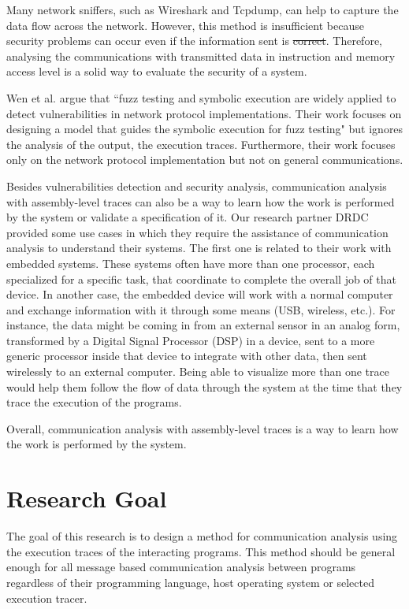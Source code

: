 \documentclass[12pt,oneside]{book}
\providecommand{\DIFaddtex}[1]{{\protect\color{blue}\uwave{#1}}} %
\providecommand{\DIFdeltex}[1]{{\protect\color{red}\sout{#1}}}                      %
\providecommand{\DIFaddbegin}{} %
\providecommand{\DIFaddend}{} %
\providecommand{\DIFdelbegin}{} %
\providecommand{\DIFdelend}{} %
\providecommand{\DIFadd}[1]{\texorpdfstring{\DIFaddtex{#1}}{#1}} %
\providecommand{\DIFdel}[1]{\texorpdfstring{\DIFdeltex{#1}}{}} %
\newcommand{\DIFscaledelfig}{0.5}
\newlength{\DIFdelgraphicswidth} %
\newlength{\DIFdelgraphicsheight} %
\newcommand{\DIFaddincludegraphics}[2][]{{\color{blue}\fbox{\DIFOincludegraphics[#1]{#2}}}} %
\newcommand{\DIFdelincludegraphics}[2][]{%
\sbox{\DIFdelgraphicsbox}{\DIFOincludegraphics[#1]{#2}}%
\settoboxwidth{\DIFdelgraphicswidth}{\DIFdelgraphicsbox} %
\settoboxtotalheight{\DIFdelgraphicsheight}{\DIFdelgraphicsbox} %
\scalebox{\DIFscaledelfig}{%
\parbox[b]{\DIFdelgraphicswidth}{\usebox{\DIFdelgraphicsbox}\\[-\baselineskip] \rule{\DIFdelgraphicswidth}{0em}}\llap{\resizebox{\DIFdelgraphicswidth}{\DIFdelgraphicsheight}{%
\setlength{\unitlength}{\DIFdelgraphicswidth}%
\begin{picture}(1,1)%
\thicklines\linethickness{2pt} %
{\color[rgb]{1,0,0}\put(0,0){\framebox(1,1){}}}%
{\color[rgb]{1,0,0}\put(0,0){\line( 1,1){1}}}%
{\color[rgb]{1,0,0}\put(0,1){\line(1,-1){1}}}%
\end{picture}%
}\hspace*{3pt}}} %
} %
\DeclareRobustCommand{\DIFaddbegin}{\DIFOaddbegin \let\includegraphics\DIFaddincludegraphics} %
\DeclareRobustCommand{\DIFaddend}{\DIFOaddend \let\includegraphics\DIFOincludegraphics} %
\DeclareRobustCommand{\DIFdelbegin}{\DIFOdelbegin \let\includegraphics\DIFdelincludegraphics} %
\DeclareRobustCommand{\DIFdelend}{\DIFOaddend \let\includegraphics\DIFOincludegraphics} %
\begin{document}
Many network sniffers, such as Wireshark\cite{_wireshark_????} and Tcpdump\cite{tcpdump_tcpdump/libpcap_????}, can help to capture the data flow across the network. However, this method is insufficient because security problems can occur even if the information sent is \DIFdelbegin \DIFdel{correct}\DIFdelend \DIFaddbegin \DIFadd{innocent}\DIFaddend . Therefore, analysing the communications with transmitted data in instruction and memory access level is a solid way to evaluate the security of a system.

Wen et al. argue that ``fuzz testing and symbolic execution are widely applied to detect vulnerabilities in network protocol implementations. Their work focuses on designing a model that guides the symbolic execution for fuzz testing" \cite{wen2017model} but ignores the analysis of the output, the execution traces. Furthermore, their work focuses only on the network protocol implementation but not on general communications.

Besides vulnerabilities detection and security analysis, communication analysis with assembly-level traces can also be a way to learn how the work is performed by the system or validate a specification of it. Our research partner DRDC provided some use cases in which they require the assistance of communication analysis to understand their systems. The first one is related to their work with embedded systems. These systems often have more than one processor, each specialized for a specific task, that coordinate to complete the overall job of that device.  In another case, the embedded device will work with a normal computer and exchange information with it through some means
(USB, wireless, etc.).  For instance, the data might be coming in from an external sensor in an analog form, transformed by a Digital Signal Processor (DSP) in a device, sent to a more generic processor inside that device to integrate with other data, then sent wirelessly to an external computer. Being able to visualize more than one trace would help them follow the flow of data through the system at the time that they trace the execution of the programs.

Overall, communication analysis with assembly-level traces is a way to learn how the work is performed by the system. 

\section{Research Goal}
The goal of this research is to design a method for communication analysis using the execution traces of the interacting programs. This method should be general enough for all message based communication analysis between programs regardless of their programming language, host operating system or selected execution tracer. 
\end{document}
